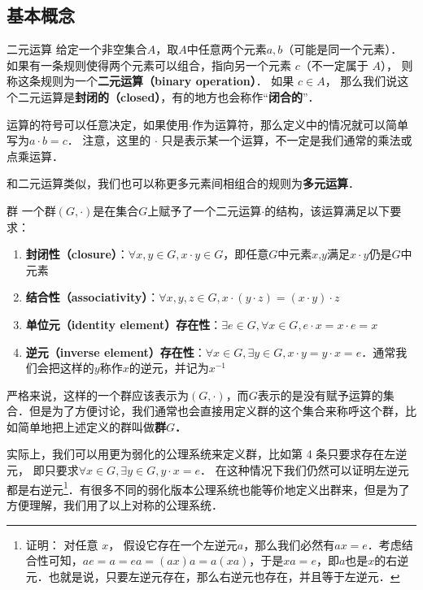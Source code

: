 


\subsection{基本概念}

\begin{definition}{二元运算}\label{Group_def2}
给定一个非空集合$A$，取$A$中任意两个元素$a, b$（可能是同一个元素）． 如果有一条规则使得两个元素可以组合，指向另一个元素 $c$（不一定属于 $A$）， 则称这条规则为一个\textbf{二元运算（binary operation）}． 如果 $c\in A$， 那么我们说这个二元运算是\textbf{封闭的（closed）}，有的地方也会称作“\textbf{闭合的}”．
\end{definition}

运算的符号可以任意决定，如果使用$\cdot$作为运算符，那么定义中的情况就可以简单写为$a· b=c$． 注意，这里的 $\cdot$ 只是表示某一个运算，不一定是我们通常的乘法或点乘运算．

和二元运算类似，我们也可以称更多元素间相组合的规则为\textbf{多元运算}．

\begin{definition}{群}\label{Group_def1}
一个群$(G, \cdot)$是在集合$G$上赋予了一个二元运算$\cdot$的结构，该运算满足以下要求：\\

\begin{enumerate}
\item \textbf{封闭性（closure）}：$∀x, y∈ G, x· y∈ G$，即任意$G$中元素$x$,$y$满足$x· y$仍是$G$中元素
\item \textbf{结合性（associativity）}：$∀ x, y, z\in G, x·(y· z)=(x· y)· z$
\item \textbf{单位元（identity element）存在性}：$∃ e\in G, ∀ x∈ G, e· x=x· e=x$
\item \textbf{逆元（inverse element）存在性}：$∀ x∈ G, ∃ y∈ G, x· y=y· x=e$．通常我们会把这样的$y$称作$x$的逆元，并记为$x^{-1}$
\end{enumerate}
\end{definition}
严格来说，这样的一个群应该表示为$(G,\cdot)$，而$G$表示的是没有赋予运算的集合．但是为了方便讨论，我们通常也会直接用定义群的这个集合来称呼这个群，比如简单地把上述定义的群叫做\textbf{群$G$．}

实际上，我们可以用更为弱化的公理系统来定义群，比如第 4 条只要求存在左逆元， 即只要求$∀ x∈ G, ∃ y∈ G, y· x=e$． 在这种情况下我们仍然可以证明左逆元都是右逆元\footnote{证明： 对任意 $x$， 假设它存在一个左逆元$a$，那么我们必然有$ax=e$．考虑结合性可知，$ae=a=ea=(ax)a=a(xa)$，于是$xa=e$，即$a$也是$x$的右逆元．也就是说，只要左逆元存在，那么右逆元也存在，并且等于左逆元．}．有很多不同的弱化版本公理系统也能等价地定义出群来，但是为了方便理解，我们用了以上对称的公理系统．

